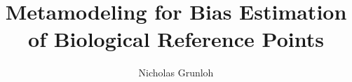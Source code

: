 \documentclass[12pt]{article}
\begin{document}
%
%

\title{\vspace*{-2.25cm}Metamodeling for Bias Estimation of Biological Reference Points} %
\author{Nicholas Grunloh}
\maketitle
\end{document}
